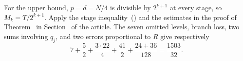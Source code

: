 For the upper bound, \(p=d=N/4\) is divisible by \(2^{k+1}\) at every stage, so \(M_k=T/2^{k+1}\). Apply the stage inequality~() and the estimates in the proof of Theorem~ in Section~ of the article. The seven omitted levels, branch loss, two sums involving \(q_j\), and two errors proportional to \(R\) give respectively
\[
 7+\frac52+\frac{3\cdot22}{4}+\frac{41}{2}+\frac{24+36}{128}=\frac{1503}{32}.
\]







